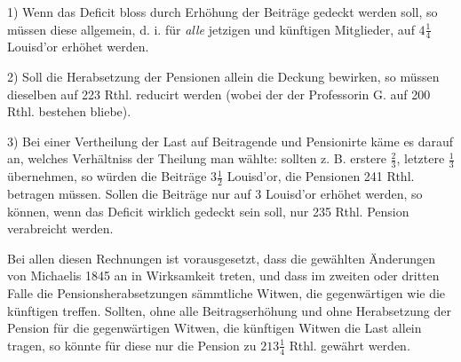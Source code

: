 1) Wenn das Deficit bloss durch Erhöhung der Beiträge gedeckt werden soll, so müssen diese allgemein, d. i. für \textit{alle} jetzigen und künftigen Mitglieder, auf \(4\tfrac{1}{4}\) Louisd’or erhöhet werden.

2) Soll die Herabsetzung der Pensionen allein die Deckung bewirken, so müssen dieselben auf 223 Rthl. reducirt werden (wobei der der Professorin G. auf 200 Rthl. bestehen bliebe).

3) Bei einer Vertheilung der Last auf Beitragende und Pensionirte käme es darauf an, welches Verhältniss der Theilung man wählte: sollten z. B. erstere \(\tfrac{2}{3}\), letztere \(\tfrac{1}{3}\) übernehmen, so würden die Beiträge \(3\tfrac{1}{2}\) Louisd’or, die Pensionen 241 Rthl. betragen müssen. Sollen die Beiträge nur auf 3 Louisd’or erhöhet werden, so können, wenn das Deficit wirklich gedeckt sein soll, nur 235 Rthl. Pension verabreicht werden.

Bei allen diesen Rechnungen ist vorausgesetzt, dass die gewählten Änderungen von Michaelis 1845 an in Wirksamkeit treten, und dass im zweiten oder dritten Falle die Pensionsherabsetzungen sämmtliche Witwen, die gegenwärtigen wie die künftigen treffen. Sollten, ohne alle Beitragserhöhung und ohne Herabsetzung der Pension für die gegenwärtigen Witwen, die künftigen Witwen die Last allein tragen, so könnte für diese nur die Pension zu \(213\tfrac{1}{4}\) Rthl. gewährt werden.

